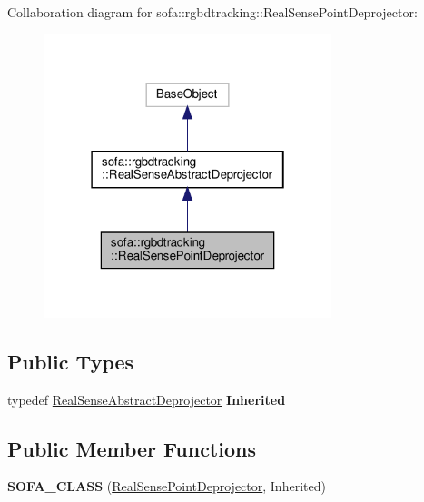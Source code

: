 Collaboration diagram for sofa\+:\+:rgbdtracking\+:\+:Real\+Sense\+Point\+Deprojector\+:
\nopagebreak
\begin{figure}[H]
\begin{center}
\leavevmode
\includegraphics[width=238pt]{classsofa_1_1rgbdtracking_1_1_real_sense_point_deprojector__coll__graph}
\end{center}
\end{figure}
\subsection*{Public Types}
\begin{DoxyCompactItemize}
\item 
\mbox{\label{classsofa_1_1rgbdtracking_1_1_real_sense_point_deprojector_a06e1fe2c0a7478ad85adf5d3add317f2}} 
typedef \hyperlink{classsofa_1_1rgbdtracking_1_1_real_sense_abstract_deprojector}{Real\+Sense\+Abstract\+Deprojector} {\bfseries Inherited}
\end{DoxyCompactItemize}
\subsection*{Public Member Functions}
\begin{DoxyCompactItemize}
\item 
\mbox{\label{classsofa_1_1rgbdtracking_1_1_real_sense_point_deprojector_ac58e605830c9aec518aab80a94dbea3d}} 
{\bfseries S\+O\+F\+A\+\_\+\+C\+L\+A\+SS} (\hyperlink{classsofa_1_1rgbdtracking_1_1_real_sense_point_deprojector}{Real\+Sense\+Point\+Deprojector}, Inherited)
\end{DoxyCompactItemize}
